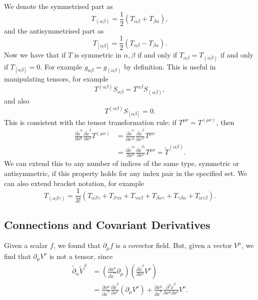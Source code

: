 \documentclass[12pt]{article}
\begin{document}
\begin{enumerate}[(i)]
		We denote the symmetrised part as
		\[
		T_{(\alpha\beta)} = \frac{1}{2}(T_{\alpha\beta} + T_{\beta\alpha}),
		\]
		and the antisymmetrised part as
		\[
			T_{[\alpha\beta]} = \frac{1}{2}(T_{\alpha\beta} - T_{\beta\alpha}).
		\]
		Now we have that if $T$ is symmetric in $\alpha, \beta$ if and only if $T_{\alpha\beta} = T_{(\alpha\beta)}$ if and only if $T_{[\alpha\beta]} = 0$. For example $g_{\alpha\beta} = g_{(\alpha\beta)}$ by definition. This is useful in manipulating tensors, for example
		\[
		T^{(\alpha\beta)}S_{\alpha\beta} = T^{\alpha\beta} S_{(\alpha\beta)},
		\]
		and also
		\[
			T^{(\alpha\beta)}S_{[\alpha\beta]} = 0.
		\]
		This is consistent with the tensor transformation rule: if $T^{\mu\nu} = T^{(\mu\nu)}$, then
		\begin{align*}
			\frac{\partial \tilde x^\alpha}{\partial x^\mu} \frac{\partial \tilde x^\beta}{\partial x^\nu} T^{(\mu\nu)} &= \frac{\partial \tilde x^\alpha}{\partial x^{(\mu}} \frac{\partial \tilde x^\beta}{\partial x^{\nu)}} T^{\mu\nu} \\
																    &= \frac{\partial \tilde x^{(\alpha}}{\partial x^\mu} \frac{\partial \tilde x^{\beta)}}{\partial x^\nu} T^{\mu\nu} = \tilde T^{(\alpha\beta)}.
		\end{align*}
		We can extend this to any number of indices of the same type, symmetric or antisymmetric, if this property holds for any index pair in the specified set. We can also extend bracket notation, for example
		\[
		T_{(\alpha\beta\gamma)} = \frac{1}{3!}(T_{\alpha\beta\gamma} + T_{\beta\gamma\alpha} + T_{\gamma\alpha\beta} + T_{\beta\alpha\gamma}  + T_{\gamma\beta\alpha} + T_{\alpha\gamma\beta}).
		\]
\end{enumerate}

\subsection{Connections and Covariant Derivatives}
\label{sub:con_cov_d}

Given a scalar $f$, we found that $\partial_\mu f$ is a covector field. But, given a vector $V^\mu$, we find that $\partial_\mu V^\nu$ is not a tensor, since
\begin{align*}
	\tilde \partial_\alpha \tilde V^\beta &= \left( \frac{\partial x^\mu}{\partial \tilde x^\alpha} \partial_\mu\right) \left( \frac{\partial \tilde x^\beta}{\partial x^\nu} V^\nu \right) \\
					      &= \frac{\partial x^\mu}{\partial \tilde x^\alpha} \frac{\partial \tilde x^\beta}{\partial x^\nu} (\partial_\mu V^\nu) + \frac{\partial x^\mu}{\partial \tilde x^\alpha} \frac{\partial^2 \tilde x^\beta}{\partial x^\mu \partial x^\nu} V^\nu.
\end{align*}
\end{document}
